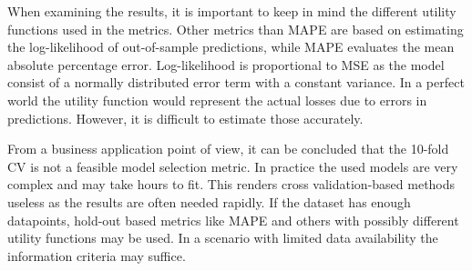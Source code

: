 \documentclass[english, 12pt, a4paper, sci, utf8, a-1b, online]{aaltothesis}
\begin{document}

When examining the results, it is important to keep in mind the different utility functions used in the metrics. Other metrics than MAPE are based on estimating the log-likelihood of out-of-sample predictions, while MAPE evaluates the mean absolute percentage error. Log-likelihood is proportional to MSE as the model consist of a normally distributed error term with a constant variance. In a perfect world the utility function would represent the actual losses due to errors in predictions. However, it is difficult to estimate those accurately. 

From a business application point of view, it can be concluded that the 10-fold CV is not a feasible model selection metric. In practice the used models are very complex and may take hours to fit. This renders cross validation-based methods useless as the results are often needed rapidly. If the dataset has enough datapoints, hold-out based metrics like MAPE and others with possibly different utility functions may be used. In a scenario with limited data availability the information criteria may suffice.



\end{document}
